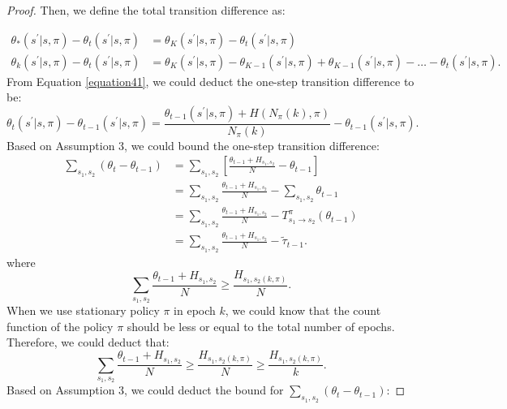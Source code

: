\begin{theorem}
\begin{proof}
Then, we define the total transition difference as:

\begin{equation}
\label{equation41}
\begin{aligned}
\theta_{*}(s^{\prime}|s,\pi) - \theta_{t}(s^{\prime}|s,\pi) &= \theta_{K}(s^{\prime}|s,\pi) - \theta_{t}(s^{\prime}|s,\pi)\\
\theta_{k}(s^{\prime}|s,\pi) - \theta_{t}(s^{\prime}|s,\pi) &= \theta_{K}(s^{\prime}|s,\pi) - \theta_{K-1}(s^{\prime}|s,\pi) + \theta_{K-1}(s^{\prime}|s,\pi) - \dots - \theta_{t}(s^{\prime}|s,\pi).
\end{aligned}
\end{equation}
From Equation \ref{equation41}, we could deduct the one-step transition difference to be:
\begin{equation}
\theta_{t}(s^{\prime}|s,\pi) - \theta_{t-1}(s^{\prime}|s,\pi) = \frac{\theta_{t-1}(s^{\prime}|s,\pi)+H\left(N_{\pi}(k), \pi\right)}{N_{\pi}(k)} - \theta_{t-1}(s^{\prime}|s,\pi).
\end{equation}
Based on Assumption 3, we could bound the one-step transition difference:
\begin{equation}
\begin{aligned}
\sum_{s_{1},s_{2}}(\theta_{t} - \theta_{t-1}) &= \sum_{s_{1},s_{2}}\left[\frac{\theta_{t-1}+H_{s_{1},s_{2}}}{N} - \theta_{t-1}\right]\\
&= \sum_{s_{1},s_{2}}\frac{\theta_{t-1}+H_{s_{1},s_{2}}}{N} - \sum_{s_{1},s_{2}}\theta_{t-1}\\
&= \sum_{s_{1},s_{2}}\frac{\theta_{t-1}+H_{s_{1},s_{2}}}{N} - T_{s_{1} \rightarrow s_{2}}^{\pi}(\theta_{t-1})\\
&= \sum_{s_{1},s_{2}}\frac{\theta_{t-1}+H_{s_{1},s_{2}}}{N} - \tilde{\tau}_{t-1}.
\end{aligned}
\end{equation}
where
\begin{equation}
\sum_{s_{1},s_{2}}\frac{\theta_{t-1}+H_{s_{1},s_{2}}}{N} \geq \frac{H_{s_{1},s_{2}(k,\pi)}}{N}.
\end{equation}
When we use stationary policy $\pi$ in epoch $k$, we could know that the count function of the policy $\pi$ should be less or equal to the total number of epochs. Therefore, we could deduct that:
\begin{equation}
 \sum_{s_{1},s_{2}}\frac{\theta_{t-1}+H_{s_{1},s_{2}}}{N} \geq \frac{H_{s_{1},s_{2}(k,\pi)}}{N} \geq \frac{H_{s_{1},s_{2}(k,\pi)}}{k}.
\end{equation}
Based on Assumption 3, we could deduct the bound for $\sum_{s_{1},s_{2}}(\theta_{t} - \theta_{t-1})$:


\end{proof}
\end{theorem}
